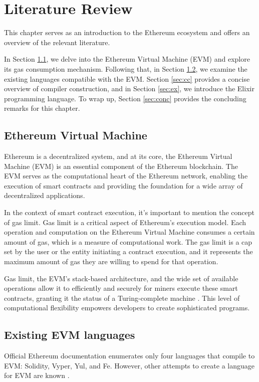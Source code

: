 \chapter{Literature Review}
\label{chap:lr}

This chapter serves as an introduction to the Ethereum ecosystem and offers an overview of the relevant literature.

In Section \ref{sec:evm}, we delve into the Ethereum Virtual Machine (EVM) and explore its gas consumption mechanism. Following that, in Section \ref{sec:langs}, we examine the existing languages compatible with the EVM. Section \ref{sec:cc} provides a concise overview of compiler construction, and in Section \ref{sec:ex}, we introduce the Elixir programming language. To wrap up, Section \ref{sec:conc} provides the concluding remarks for this chapter.

\section{Ethereum Virtual Machine}
\label{sec:evm}
Ethereum is a decentralized system, and at its core, the Ethereum Virtual Machine (EVM) is an essential component of the Ethereum blockchain. The EVM serves as the computational heart of the Ethereum network, enabling the execution of smart contracts and providing the foundation for a wide array of decentralized applications.

In the context of smart contract execution, it's important to mention the concept of gas limit. Gas limit is a critical aspect of Ethereum's execution model. Each operation and computation on the Ethereum Virtual Machine consumes a certain amount of gas, which is a measure of computational work. The gas limit is a cap set by the user or the entity initiating a contract execution, and it represents the maximum amount of gas they are willing to spend for that operation.

Gas limit, the EVM's stack-based architecture, and the wide set of available operations allow it to efficiently and securely for miners execute these smart contracts, granting it the status of a Turing-complete machine \cite{EthereumWhitepaper}. This level of computational flexibility empowers developers to create sophisticated programs.

\section{Existing EVM languages}
\label{sec:langs}
Official Ethereum documentation \cite{OfficialEthereumLanguages} enumerates only four languages that compile to EVM: Solidity, Vyper, Yul, and Fe. However, other attempts to create a language for EVM are known \cite{CommunityEthereumLanguages}.

